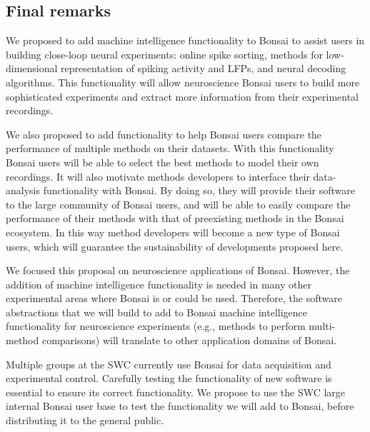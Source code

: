 \subsection{Final remarks}
\label{sec:finalRemarks}

We proposed to add machine intelligence functionality to Bonsai to assist users
in building close-loop neural experiments: online spike sorting, methods for
low-dimensional representation of spiking activity and LFPs, and neural
decoding algorithms. This functionality will allow neuroscience Bonsai users to
build more sophisticated experiments and extract more information from their
experimental recordings.

We also proposed to add functionality to help Bonsai users compare the
performance of multiple methods on their datasets. With this functionality
Bonsai users will be able to select the best methods to model their own
recordings. It will also motivate methods developers to interface their
data-analysis functionality with Bonsai. By doing so, they will provide their
software to the large community of Bonsai users, and will be able to easily
compare the performance of their methods with that of preexisting methods in
the Bonsai ecosystem. In this way method developers will become a new type of
Bonsai users, which will guarantee the sustainability of developments
proposed here.

We focused this proposal on neuroscience applications of Bonsai. However, the
addition of machine intelligence functionality is needed in many other
experimental areas where Bonsai is or could be used. Therefore, the software
abstractions that we will build to add to Bonsai machine intelligence
functionality for neuroscience experiments (e.g., methods to perform
multi-method comparisons) will translate to other application domains of
Bonsai.

Multiple groups at the SWC currently use Bonsai for data acquisition and
experimental control. Carefully testing the functionality of new software is
essential to ensure its correct functionality. We propose to use the SWC large
internal Bonsai user base to test the functionality we will add to Bonsai,
before distributing it to the general public.

